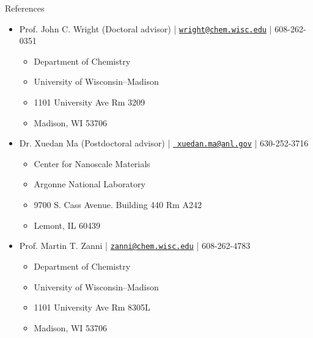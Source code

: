 \documentclass{resume} %
\begin{document}
\begin{rSection}{References}
	\begin{itemize}[leftmargin = 0 pt]
		\item Prof. John C. Wright (Doctoral advisor) | \href{mailto:wright@chem.wisc.edu}{\texttt{wright@chem.wisc.edu}} | 608-262-0351
		\begin{itemize}
			\item[] Department of Chemistry
			\item[] University of Wisconsin--Madison
			\item[] 1101 University Ave Rm 3209
			\item[] Madison, WI 53706
		\end{itemize}
		\item Dr. Xuedan Ma (Postdoctoral advisor) | \href{mailto: xuedan.ma@anl.gov}{\texttt{ xuedan.ma@anl.gov}} | 630-252-3716
		\begin{itemize}
			\item[] Center for Nanoscale Materials
			\item[] Argonne National Laboratory
			\item[] 9700 S. Cass Avenue. Building 440 Rm A242
			\item[] Lemont, IL 60439
		\end{itemize}	
		\item Prof. Martin T. Zanni | \href{mailto:zanni@chem.wisc.edu}{\texttt{zanni@chem.wisc.edu}} | 608-262-4783
		\begin{itemize}
			\item[] Department of Chemistry
			\item[] University of Wisconsin--Madison
			\item[] 1101 University Ave Rm 8305L
			\item[] Madison, WI 53706
		\end{itemize}
		

\end{itemize}
\end{rSection}
\end{document}
